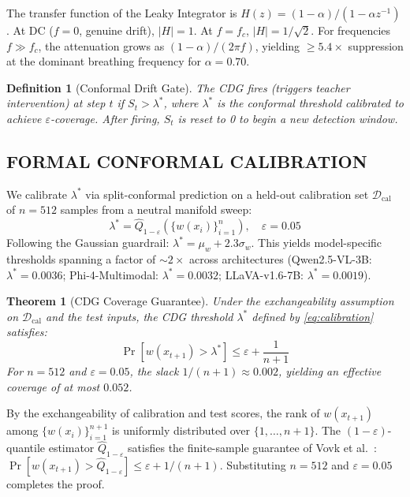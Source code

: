 \documentclass{ieeetmlcn}
\newtheorem{theorem}{Theorem}
\newtheorem{definition}{Definition}
\begin{document}
\begin{IEEEproof}
The transfer function of the Leaky Integrator is
$H(z) = (1-\alpha)/(1-\alpha z^{-1})$. At DC ($f=0$, genuine drift),
$|H|=1$. At $f = f_c$, $|H| = 1/\sqrt{2}$. For frequencies
$f \gg f_c$, the attenuation grows as $(1-\alpha)/(2\pi f)$, yielding
$\geq 5.4\times$ suppression at the dominant breathing frequency for
$\alpha = 0.70$.
\end{IEEEproof}

\begin{definition}[Conformal Drift Gate]
The CDG fires (triggers teacher intervention) at step $t$ if
$S_t > \lambda^*$, where $\lambda^*$ is the conformal threshold
calibrated to achieve $\varepsilon$-coverage. After firing, $S_t$ is
reset to 0 to begin a new detection window.
\end{definition}

\subsection{FORMAL CONFORMAL CALIBRATION}
We calibrate $\lambda^*$ via split-conformal prediction on a held-out
calibration set $\mathcal{D}_{\text{cal}}$ of $n=512$ samples from a
neutral manifold sweep:
\begin{equation}
  \lambda^* = \hat{Q}_{1-\varepsilon}\!\left(\{w(x_i)\}_{i=1}^n\right),
  \quad \varepsilon = 0.05
  \label{eq:calibration}
\end{equation}
Following the Gaussian guardrail: $\lambda^* = \mu_w + 2.3\sigma_w$.
This yields model-specific thresholds spanning a factor of $\sim\!2\times$
across architectures (Qwen2.5-VL-3B: $\lambda^*=0.0036$;
Phi-4-Multimodal: $\lambda^*=0.0032$; LLaVA-v1.6-7B: $\lambda^*=0.0019$).

\begin{theorem}[CDG Coverage Guarantee]
\label{thm:coverage}
Under the exchangeability assumption on $\mathcal{D}_{\text{cal}}$ and
the test inputs, the CDG threshold $\lambda^*$ defined by
\eqref{eq:calibration} satisfies:
\begin{equation}
  \Pr\!\left[w(x_{t+1}) > \lambda^*\right] \leq \varepsilon +
  \frac{1}{n+1}
  \label{eq:guarantee}
\end{equation}
For $n=512$ and $\varepsilon=0.05$, the slack $1/(n+1)\approx 0.002$,
yielding an effective coverage of at most $0.052$.
\end{theorem}

\begin{IEEEproof}
By the exchangeability of calibration and test scores, the rank of
$w(x_{t+1})$ among $\{w(x_i)\}_{i=1}^{n+1}$ is uniformly distributed
over $\{1,\ldots,n+1\}$. The $(1-\varepsilon)$-quantile estimator
$\hat{Q}_{1-\varepsilon}$ satisfies the finite-sample guarantee of Vovk
et al.\ : $\Pr[w(x_{t+1}) > \hat{Q}_{1-\varepsilon}]
\leq \varepsilon + 1/(n+1)$. Substituting $n=512$ and $\varepsilon=0.05$
completes the proof.
\end{IEEEproof}
 
\end{document}
